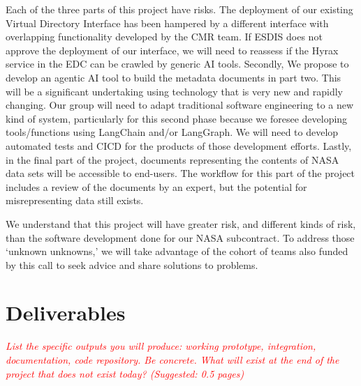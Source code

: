 \documentclass[11pt]{article}
\begin{document}
Each of the three parts of this project have risks. The deployment of our existing Virtual Directory Interface has been hampered by a different interface with overlapping functionality developed by the \ac{CMR} team. If \ac{ESDIS} does not approve the deployment of our interface, we will need to reassess if the Hyrax service in the \ac{EDC} can be crawled by generic \ac{AI} tools. Secondly, We propose to develop an agentic \ac{AI} tool to build the metadata documents in part two. This will be a significant undertaking using technology that is very new and rapidly changing. Our group will need to adapt traditional software engineering to a new kind of system, particularly for this second phase because we foresee developing tools/functions using LangChain and/or LangGraph. We will need to develop automated tests and \ac{CICD} for the products of those development efforts. Lastly, in the final part of the project, documents representing the contents of \ac{NASA} data sets will be accessible to end-users. The workflow for this part of the project includes a review of the documents by an expert, but the potential for misrepresenting data still exists.

We understand that this project will have greater risk, and different kinds of risk, than the software development done for our \ac{NASA} subcontract. To address those `unknown unknowns,' we will take advantage of the cohort of teams also funded by this call to seek advice and share solutions to problems. 

\section{Deliverables}
\textcolor{red}{\textit{List the specific outputs you will produce: working prototype, integration, documentation, code repository. Be concrete. What will exist at the end of the project that does not exist today? (Suggested: 0.5 pages)}}
\end{document}
